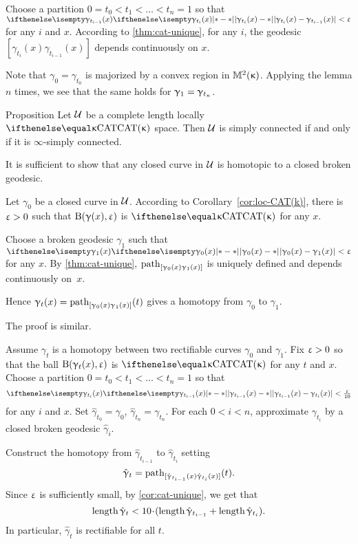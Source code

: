 Choose a partition $0=t_0<t_1<\dots<t_n=1$
so that $\dist{\gamma_{t_i}(x)}{\gamma_{t_{i-1}}(x)}{}<\eps$
for any $i$ and $x$.
According to \ref{thm:cat-unique},
for any $i$,
the geodesic $[\gamma_{t_i}(x)\gamma_{t_{i-1}}(x)]$ depends continuously on $x$.

Note that $\gamma_0=\gamma_{t_0}$ is majorized by a convex region in $\mathbb{M}_{{}}^{2}({\upkappa})$.
Applying the lemma $n$ times, we see that the same holds for $\gamma_1\z=\gamma_{t_n}$.
\qeds

\begin{thm}{Proposition}\label{prop:sc}
Let $\mathcal{U}$ be a complete length locally $\CAT\kappa$ space.
Then $\mathcal{U}$ is simply connected if and only if it is $\infty$-simply connected.
\end{thm}

It is sufficient to show that any closed curve in $\mathcal{U}$ is homotopic to a closed broken geodesic.

Let $\gamma_0$ be a closed curve in $\mathcal{U}$.
According to Corollary~\ref{cor:loc-CAT(k)},
there is $\upvarepsilon>0$ such that 
$\mathrm{B}{}(\upgamma(x),\upvarepsilon)$ is $\CAT\kappa$
for any $x$.

Choose a broken geodesic $\gamma_1$ such that $\dist{\gamma_0(x)}{\gamma_1(x)}{}<\eps$ for any $x$.
By \ref{thm:cat-unique}, 
$\mathrm{path}_{[\upgamma_0(x)\upgamma_1(x)]}$ 
is uniquely defined 
and depends continuously on~$x$.

Hence $\upgamma_t(x)=\mathrm{path}_{[\upgamma_0(x)\upgamma_1(x)]}(t)$ gives a homotopy from $\gamma_0$ to $\gamma_1$.

 The proof is similar.

Assume $\gamma_t$ is a homotopy between two rectifiable curves $\gamma_0$ and $\gamma_1$.
Fix $\upvarepsilon>0$ so that the ball $\mathrm{B}{}(\upgamma_t(x),\upvarepsilon)$ is $\CAT\kappa$
for any $t$ and $x$.
Choose a partition $0=t_0<t_1<\dots<t_n=1$ 
so that 
$$\dist{\gamma_{t_{i-1}}(x)}{\gamma_{t_i}(x)}{}<\tfrac\eps{10}$$
for any $i$ and $x$.
Set $\hat\gamma_{t_0}=\gamma_0$, $\hat\gamma_{t_n}=\gamma_{t_n}$.
For each $0<i<n$, approximate $\gamma_{t_i}$ by a closed broken geodesic $\hat\gamma_{i}$.

Construct the homotopy 
from $\hat\gamma_{t_{i-1}}$ 
to $\hat\gamma_{t_i}$ 
setting 
$$\hat{\upgamma}_t
=
\mathrm{path}_{[\hat{\upgamma}_{t_{i-1}}(x)\hat{\upgamma}_{t_i}(x)]}(t).$$
Since $\upvarepsilon$ is sufficiently small, 
by \ref{cor:cat-unique}, we get that
$$\length\hat\gamma_t
<
10\cdot(\length\hat\gamma_{t_{i-1}}+\length\hat\gamma_{t_i}).$$
In particular, $\hat\gamma_t$ is rectifiable for all $t$.

